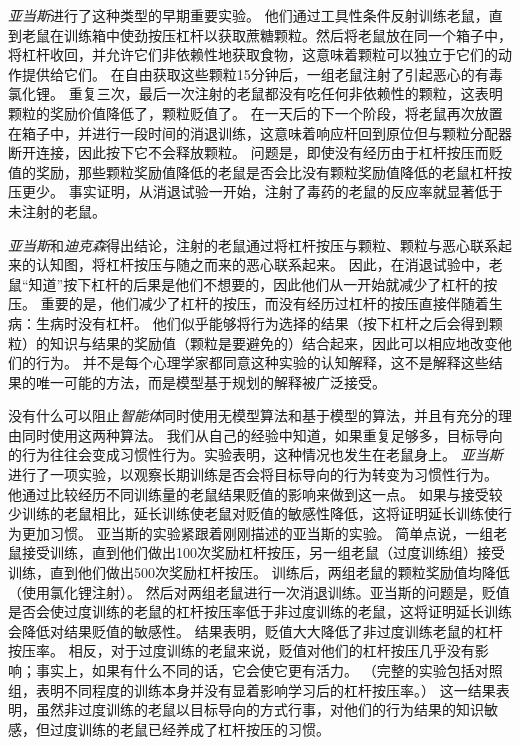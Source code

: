 \textit{亚当斯}\cite{adams1981instrumental}进行了这种类型的早期重要实验。
他们通过工具性条件反射训练老鼠，直到老鼠在训练箱中使劲按压杠杆以获取蔗糖颗粒。然后将老鼠放在同一个箱子中，将杠杆收回，并允许它们非依赖性地获取食物，这意味着颗粒可以独立于它们的动作提供给它们。
在自由获取这些颗粒15分钟后，一组老鼠注射了引起恶心的有毒氯化锂。
重复三次，最后一次注射的老鼠都没有吃任何非依赖性的颗粒，这表明颗粒的奖励价值降低了，颗粒贬值了。
在一天后的下一个阶段，将老鼠再次放置在箱子中，并进行一段时间的消退训练，这意味着响应杆回到原位但与颗粒分配器断开连接，因此按下它不会释放颗粒。
问题是，即使没有经历由于杠杆按压而贬值的奖励，那些颗粒奖励值降低的老鼠是否会比没有颗粒奖励值降低的老鼠杠杆按压更少。
事实证明，从消退试验一开始，注射了毒药的老鼠的反应率就显著低于未注射的老鼠。


\textit{亚当斯}和\textit{迪克森}得出结论，注射的老鼠通过将杠杆按压与颗粒、颗粒与恶心联系起来的认知图，将杠杆按压与随之而来的恶心联系起来。
因此，在消退试验中，老鼠“知道”按下杠杆的后果是他们不想要的，因此他们从一开始就减少了杠杆的按压。
重要的是，他们减少了杠杆的按压，而没有经历过杠杆的按压直接伴随着生病：生病时没有杠杆。
他们似乎能够将行为选择的结果（按下杠杆之后会得到颗粒）的知识与结果的奖励值（颗粒是要避免的）结合起来，因此可以相应地改变他们的行为。
并不是每个心理学家都同意这种实验的认知解释，这不是解释这些结果的唯一可能的方法，而是模型基于规划的解释被广泛接受。


没有什么可以阻止\textit{智能体}同时使用无模型算法和基于模型的算法，并且有充分的理由同时使用这两种算法。
我们从自己的经验中知道，如果重复足够多，目标导向的行为往往会变成习惯性行为。实验表明，这种情况也发生在老鼠身上。
\textit{亚当斯}\cite{adams1982variations}进行了一项实验，以观察长期训练是否会将目标导向的行为转变为习惯性行为。
他通过比较经历不同训练量的老鼠结果贬值的影响来做到这一点。
如果与接受较少训练的老鼠相比，延长训练使老鼠对贬值的敏感性降低，这将证明延长训练使行为更加习惯。
亚当斯的实验紧跟着刚刚描述的亚当斯\cite{adams1981instrumental}的实验。
简单点说，一组老鼠接受训练，直到他们做出100次奖励杠杆按压，另一组老鼠（过度训练组）接受训练，直到他们做出500次奖励杠杆按压。
训练后，两组老鼠的颗粒奖励值均降低（使用氯化锂注射）。
然后对两组老鼠进行一次消退训练。亚当斯的问题是，贬值是否会使过度训练的老鼠的杠杆按压率低于非过度训练的老鼠，这将证明延长训练会降低对结果贬值的敏感性。
结果表明，贬值大大降低了非过度训练老鼠的杠杆按压率。
相反，对于过度训练的老鼠来说，贬值对他们的杠杆按压几乎没有影响；事实上，如果有什么不同的话，它会使它更有活力。
（完整的实验包括对照组，表明不同程度的训练本身并没有显着影响学习后的杠杆按压率。）
这一结果表明，虽然非过度训练的老鼠以目标导向的方式行事，对他们的行为结果的知识敏感，但过度训练的老鼠已经养成了杠杆按压的习惯。



